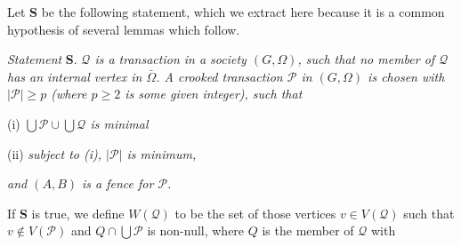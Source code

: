 Let \textbf{S} be the following statement, which we extract here because it is a common hypothesis of several lemmas which follow.

\textit{Statement} \textbf{S}. \textit{$\mathscr{Q}$ is a transaction in a society $(G, \Omega)$, such that no member of $\mathscr{Q}$ has an internal vertex in $\bar{\Omega}$. A crooked transaction $\mathscr{P}$ in $(G, \Omega)$ is chosen with $|\mathscr{P}| \ge p$ (where $p \ge 2$ is some given integer), such that}

\hspace*{12pt}(i) \textit{$\bigcup \mathscr{P} \cup \bigcup \mathscr{Q}$ is minimal}

\hspace*{12pt}(ii) \textit{subject to (i), $|\mathscr{P}|$ is minimum,}

\textit{and $(A, B)$ is a fence for $\mathscr{P}$.}

If \textbf{S} is true, we define $W(\mathscr{Q})$ to be the set of those vertices $v \in V(\mathscr{Q})$ such that $v \notin V(\mathscr{P})$ and $Q \cap \bigcup \mathscr{P}$ is non-null, where $Q$ is the member of $\mathscr{Q}$ with
